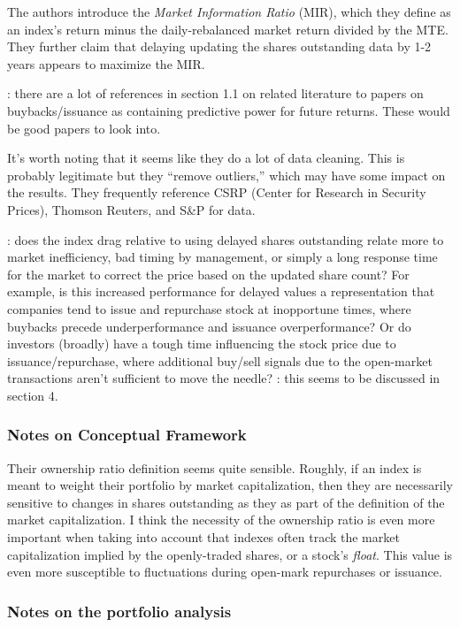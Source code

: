 The authors introduce the {\it Market Information Ratio} (MIR), which they define as an index's return minus the daily-rebalanced market return divided by the MTE.  They further claim that delaying updating the shares outstanding data by 1-2 years appears to maximize the MIR.

: there are a lot of references in section 1.1 on related literature to papers on buybacks/issuance as containing predictive power for future returns.  These would be good papers to look into.

It's worth noting that it seems like they do a lot of data cleaning.  This is probably legitimate but they ``remove outliers,'' which may have some impact on the results.  They frequently reference CSRP (Center for Research in Security Prices), Thomson Reuters, and S\&P for data.

: does the index drag relative to using delayed shares outstanding relate more to market inefficiency, bad timing by management, or simply a long response time for the market to correct the price based on the updated share count?  For example, is this increased performance for delayed values a representation that companies tend to issue and repurchase stock at inopportune times, where buybacks precede underperformance and issuance overperformance?  Or do investors (broadly) have a tough time influencing the stock price due to issuance/repurchase, where additional buy/sell signals due to the open-market transactions aren't sufficient to move the needle?  \note{[Note]}: this seems to be discussed in section 4.

\subsubsection{Notes on Conceptual Framework}

Their ownership ratio definition seems quite sensible.  Roughly, if an index is meant to weight their portfolio by market capitalization, then they are necessarily sensitive to changes in shares outstanding as they as part of the definition of the market capitalization.  I think the necessity of the ownership ratio is even more important when taking into account that indexes often track the market capitalization implied by the openly-traded shares, or a stock's {\it float}.  This value is even more susceptible to fluctuations during open-mark repurchases or issuance.

\subsubsection{Notes on the portfolio analysis}

